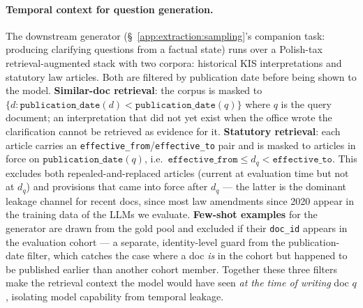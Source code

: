 \paragraph{Temporal context for question generation.}
The downstream generator (\S~\ref{app:extraction:sampling}'s
companion task: producing clarifying questions from a factual state)
runs over a Polish-tax retrieval-augmented stack with two corpora:
historical KIS interpretations and statutory law articles. Both are
filtered by publication date before being shown to the model.
\textbf{Similar-doc retrieval}: the corpus is masked to
$\{d : \texttt{publication\_date}(d) < \texttt{publication\_date}(q)\}$
where $q$ is the query document; an interpretation that did not yet
exist when the office wrote the clarification cannot be retrieved
as evidence for it. \textbf{Statutory retrieval}: each article
carries an \texttt{effective\_from}/\texttt{effective\_to} pair and
is masked to articles in force on $\texttt{publication\_date}(q)$,
i.e.\ $\texttt{effective\_from} \leq d_q < \texttt{effective\_to}$.
This excludes both repealed-and-replaced articles (current at
evaluation time but not at $d_q$) and provisions that came into
force after $d_q$ --- the latter is the dominant leakage channel for
recent docs, since most law amendments since 2020 appear in the
training data of the LLMs we evaluate. \textbf{Few-shot examples}
for the generator are drawn from the gold pool and excluded if their
\texttt{doc\_id} appears in the evaluation cohort --- a separate,
identity-level guard from the publication-date filter, which catches
the case where a doc \emph{is} in the cohort but happened to be
published earlier than another cohort member. Together these three
filters make the retrieval context the model would have seen
\emph{at the time of writing} doc $q$, isolating model capability
from temporal leakage.


\newcommand{\rulepair}[2]{%
\par\noindent
\begin{minipage}[t]{0.485\linewidth}\raggedright #1\end{minipage}%
\hspace{1em}%
\begin{minipage}[t]{0.485\linewidth}\raggedright #2\end{minipage}%
\par\smallskip}

